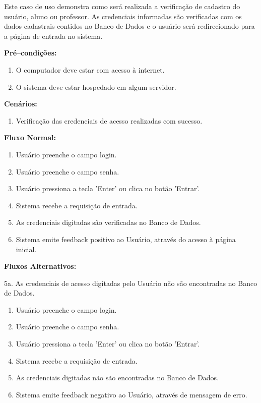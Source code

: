 \documentclass[graduacao,brazil]{ThesisPUC}
\begin{document}
Este caso de uso demonstra como ser\'{a} realizada a verifica\c{c}\~{a}o de cadastro do usu\'{a}rio, aluno ou professor.
As credenciais informadas s\~{a}o verificadas com os dados cadastrais contidos no Banco de Dados e o usuário ser\'{a}
redirecionado para a p\'{a}gina de entrada no sistema.


\textbf{Pr\'{e}--condi\c{c}\~{o}es:}

\begin{enumerate}
  \item O computador deve estar com acesso \`{a} internet.
  \item O sistema deve estar hospedado em algum servidor.
\end{enumerate}

\textbf{Cenários:}

\begin{enumerate}
  \item Verifica\c{c}\~{a}o das credenciais de acesso realizadas com sucesso.
\end{enumerate}

\textbf{Fluxo Normal:}

\begin{enumerate}
  \item Usu\'{a}rio preenche o campo login.
  \item Usu\'{a}rio preenche o campo senha.
  \item Usu\'{a}rio pressiona a tecla 'Enter' ou clica no bot\~{a}o 'Entrar'.
  \item Sistema recebe a requisi\c{c}\~{a}o de entrada.
  \item As credenciais digitadas s\~{a}o verificadas no Banco de Dados.
  \item Sistema emite feedback positivo ao Usu\'{a}rio, atrav\'{e}s do acesso \`{a} p\'{a}gina inicial.
\end{enumerate}

\textbf{Fluxos Alternativos:}

5a. As credenciais de acesso digitadas pelo Usu\'{a}rio n\~{a}o s\~{a}o encontradas no Banco de Dados.

\begin{enumerate}
  \item Usu\'{a}rio preenche o campo login.
  \item Usu\'{a}rio preenche o campo senha.
  \item Usu\'{a}rio pressiona a tecla 'Enter' ou clica no bot\~{a}o 'Entrar'.
  \item Sistema recebe a requisi\c{c}\~{a}o de entrada.
  \item As credenciais digitadas n\~{a}o s\~{a}o encontradas no Banco de Dados.
  \item Sistema emite feedback negativo ao Usu\'{a}rio, atrav\'{e}s de mensagem de erro.
\end{enumerate}
\end{document}
